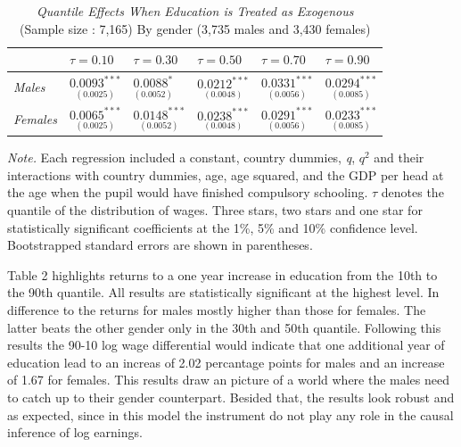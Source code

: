\documentclass[12pt,a4paper]{article}
\begin{document}
\begin{table}[!htbp]
\captionsetup{labelsep=newline, justification=centering}
  \begin{threeparttable}
       \caption{\textit{Quantile Effects When Education is Treated as Exogenous} \\
    \scriptsize (Sample size : 7,165) By gender (3,735 males and 3,430 females)}
     \begin{tabular}{*{6}{l}}
        \toprule
         & \( \tau=0.10\) & \( \tau= 0.30\) & \( \tau= 0.50\) & \( \tau= 0.70\) & \( \tau= 0.90\) \\
        \midrule
        \addlinespace
        \textit{Males}   & $\underset{(0.0025)}{0.0093^{***}}$ & $\underset{(0.0052)}{0.0088^{*}}$ & $\underset{(0.0048)}{0.0212^{***}}$ & $\underset{(0.0056)}{0.0331^{***}}$ & $\underset{(0.0085)}{0.0294^{***}}$
\\
        \textit{Females}& $\underset{(0.0025)}{0.0065^{***}}$ & $\underset{(0.0052)}{0.0148^{***}}$ & $\underset{(0.0048)}{0.0238^{***}}$ & $\underset{(0.0056)}{0.0291^{***}}$ & $\underset{(0.0085)}{0.0233^{***}}$ \\
        \bottomrule
     \end{tabular}
    \begin{tablenotes}[flushleft]
      \small
      \item \textit{Note.} Each regression included a constant, country dummies, \textit{q}, \textit{$q^2$} and their interactions with country dummies, age, age squared, and the GDP per head at the age when the pupil would have finished compulsory schooling. $\tau$ denotes the quantile of the distribution of wages. Three stars, two stars and one star for statistically significant coefficients at the 1\%, 5\% and 10\% confidence level. Bootstrapped standard errors are shown in parentheses.
    \end{tablenotes}
  \end{threeparttable}
\end{table}

Table 2 highlights returns to a one year increase in education from the
10th to the 90th quantile. All results are statistically significant at
the highest level. In difference to \textcite{brunello} the returns for
males mostly higher than those for females. The latter beats the other
gender only in the 30th and 50th quantile. Following this results the
90-10 log wage differential would indicate that one additional year of
education lead to an increas of 2.02 percantage points for males and an
increase of 1.67 for females. This results draw an picture of a world
where the males need to catch up to their gender counterpart. Besided
that, the results look robust and as expected, since in this model the
instrument do not play any role in the causal inference of log earnings.
\end{document}
